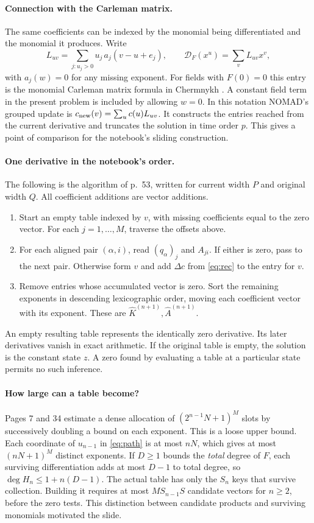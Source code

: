 \documentclass[11pt,letterpaper]{article}
\newcommand{\D}{\mathcal{D}_F}
\newcommand{\src}[1]{\par\smallskip\noindent{\small\itshape Notebook, #1.}\par\medskip}
\begin{document}
\paragraph{Connection with the Carleman matrix.}
The same coefficients can be indexed by the monomial being differentiated
and the monomial it produces. Write
\[
 L_{uv}=\sum_{j:u_j>0}u_j\,a_j(v-u+e_j),\qquad
 \D(x^u)=\sum_v L_{uv}x^v ,
\]
with \(a_j(w)=0\) for any missing exponent. For fields with \(F(0)=0\)
this entry is the monomial Carleman matrix formula in
Chermnykh \cite[Prop.~4, Eq.~(5)]{carleman}. A constant field term in the
present problem is included by allowing \(w=0\). In this notation NOMAD's
grouped update is \(c_{\rm new}(v)=\sum_u c(u)L_{uv}\). It constructs
the entries reached from the current derivative and truncates the solution
in time order \(p\). This gives a point of comparison for the notebook's
sliding construction.

\paragraph{One derivative in the notebook's order.}
The following is the algorithm of p.~53, written for current width \(P\) and
original width \(Q\). All coefficient additions are vector additions.
\begin{enumerate}
\item Start an empty table indexed by \(v\), with missing coefficients equal to
the zero vector. For each \(j=1,\ldots,M\), traverse the offsets above.
\item For each aligned pair \((\alpha,i)\), read \((q_\alpha)_j\) and
\(A_{ji}\). If either is zero, pass to the next pair. Otherwise form \(v\) and
add \(\Delta c\) from \eqref{eq:rec} to the entry for \(v\).
\item Remove entries whose accumulated vector is zero. Sort the remaining
exponents in descending lexicographic order, moving each coefficient vector
with its exponent. These are \(\widehat K^{(n+1)},\widehat A^{(n+1)}\).
\end{enumerate}
An empty resulting table represents the identically zero derivative. Its later
derivatives vanish in exact arithmetic. If the original table is empty, the
solution is the constant state \(z\). A zero found by evaluating a table at a particular state permits no such inference.

\paragraph{How large can a table become?}
Pages 7 and 34 estimate a dense allocation of \((2^{n-1}N+1)^M\) slots
by successively doubling a bound on each exponent. This is a loose upper
bound. Each coordinate of \(u_{n-1}\) in \eqref{eq:path} is at most \(nN\), which gives at most \((nN+1)^M\)
distinct exponents. If \(D\ge1\) bounds the \emph{total} degree of \(F\),
each surviving differentiation adds at most \(D-1\) to total degree, so
\(\deg H_n\le 1+n(D-1)\). The actual table has only the \(S_n\) keys that
survive collection. Building it requires at most \(MS_{n-1}S\) candidate
vectors for \(n\ge2\), before the zero tests. This distinction between candidate
products and surviving monomials motivated the slide.
\src{pp.~7--9, 33--53}
\end{document}
